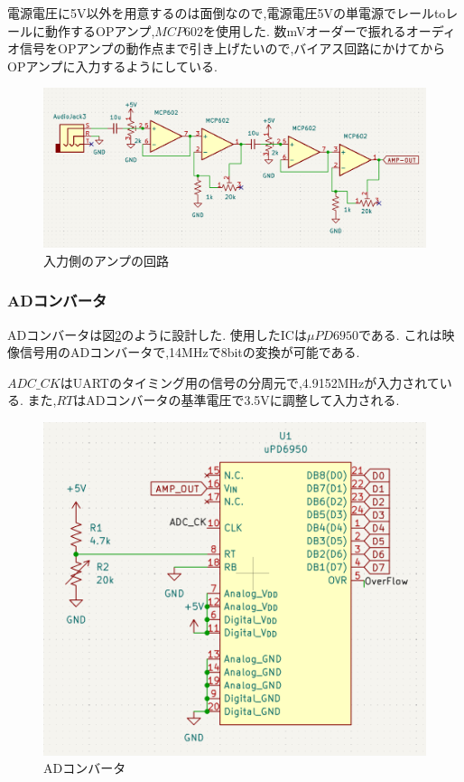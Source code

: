 \documentclass[a4paper,10pt]{article}
\begin{document}
\begin{multicols}{2}[\raggedcolumns]
電源電圧に5V以外を用意するのは面倒なので,電源電圧5Vの単電源でレールtoレールに動作するOPアンプ,$MCP602$を使用した.
数mVオーダーで振れるオーディオ信号をOPアンプの動作点まで引き上げたいので,バイアス回路にかけてからOPアンプに入力するようにしている.

\begin{figure}[H]
    \centering
    \includegraphics[width=1.5\linewidth,angle=270]{figure/in_amp.png} 
    \caption{入力側のアンプの回路} 
    \label{fig:in_amp}
\end{figure}

\subsubsection{ADコンバータ}
ADコンバータは図\ref{fig:adc}のように設計した.
使用したICは$\mu PD6950$である.
これは映像信号用のADコンバータで,14MHzで8bitの変換が可能である.

$ADC\_CK$はUARTのタイミング用の信号の分周元で,4.9152MHzが入力されている.
また,$RT$はADコンバータの基準電圧で3.5Vに調整して入力される.

\begin{figure}[H]
    \centering
    \includegraphics[width=0.8\linewidth]{figure/adc.png} 
    \caption{ADコンバータ} 
    \label{fig:adc}
\end{figure}


\end{multicols}
\end{document}
